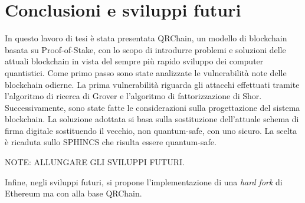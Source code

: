 \chapter{Conclusioni e sviluppi futuri}
In questo lavoro di tesi è stata presentata QRChain, un modello di blockchain basata su Proof-of-Stake, con lo scopo di introdurre problemi e soluzioni delle attuali blockchain in vista del sempre più rapido sviluppo dei computer quantistici. Come primo passo sono state analizzate le vulnerabilità note delle blockchain odierne. La prima vulnerabilità riguarda gli attacchi effettuati tramite l'algoritmo di ricerca di Grover e l'algoritmo di fattorizzazione di Shor. Successivamente, sono state fatte le considerazioni sulla progettazione del sistema blockchain. La soluzione adottata si basa sulla sostituzione dell'attuale schema di firma digitale sostituendo il vecchio, non quantum-safe, con uno sicuro. La scelta è ricaduta sullo SPHINCS che risulta essere quantum-safe.

NOTE: ALLUNGARE GLI SVILUPPI FUTURI.

Infine, negli sviluppi futuri, si propone l'implementazione di una \textit{hard fork} di Ethereum ma con alla base QRChain.